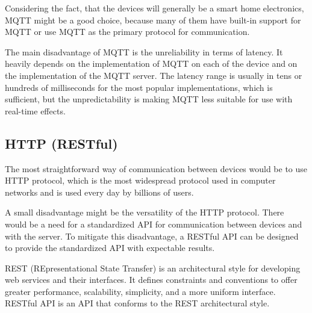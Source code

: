 Considering the fact, that the devices will generally be a smart home
electronics, MQTT might be a good choice, because many of them have built-in
support for MQTT or use MQTT as the primary protocol for communication.


The main disadvantage of MQTT is the unreliability in terms of latency.
It heavily depends on the implementation of MQTT on each of the device and on
the implementation of the MQTT server. The latency range is usually
in tens or hundreds of milliseconds for the most popular implementations,
\cite{mqttlat} which is sufficient, but the unpredictability is making MQTT
less suitable for use with real-time effects.


\hypertarget{x-http-(restful)}{\subsection{HTTP (RESTful)}}
The most straightforward way of communication between devices would be to use
HTTP protocol, which is the most widespread protocol used in computer networks
and is used every day by billions of users. \cite{httpsrv}


A small disadvantage might be the versatility of the HTTP protocol. There would be
a need for a standardized API for communication between devices and with the
server. To mitigate this disadvantage, a RESTful API can be designed to provide
the standardized API with expectable results.


REST (REpresentational State Transfer) is an architectural style for developing
web services and their interfaces. It defines constraints and conventions to
offer greater performance, scalability, simplicity, and a more uniform interface.
\cite{restdef} RESTful API is an API that conforms to the REST architectural style.